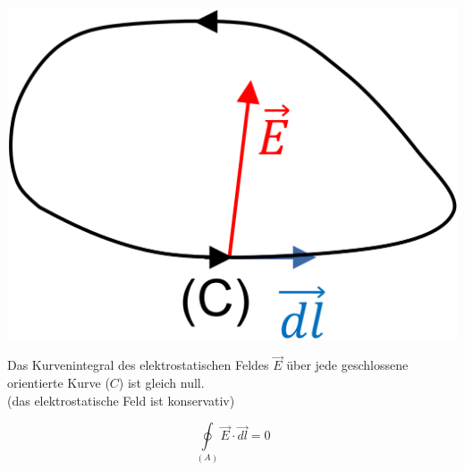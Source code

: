 \begin{minipage}[c]{0.31\columnwidth}
    \includegraphics[width=\columnwidth]{images/V1B1.png}
\end{minipage}
\hfill
\begin{minipage}[c]{0.65\columnwidth}

    Das Kurvenintegral des elektrostatischen Feldes $\vec{E}$ 
    über jede geschlossene orientierte Kurve ($C$) ist 
    gleich null.\\
    (das elektrostatische Feld ist konservativ)

    \[
        \boxed{\underset{(A)}{\operatorname*{\oint}} \vec{E} \cdot\vec{dl} = 0}
    \]

\end{minipage}



